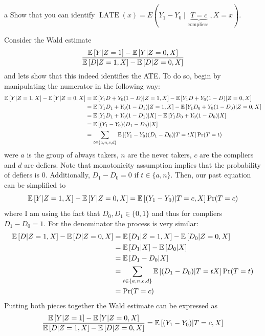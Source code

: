 \documentclass{article}
\begin{document}
\begin{problem}{a}
Show that you can identify $\operatorname{LATE}(x)=E(Y_{1}-Y_{0} \mid \underbrace{T=c}_{\text {compliers }}, X=x)$.
\end{problem}
\begin{solution}
Consider the Wald estimate
\begin{equation*}
    \frac{\mathbb{E}\left[Y\vert Z=1\right]-\mathbb{E}\left[Y\vert Z=0,X\right]}{\mathbb{E}\left[D\vert Z=1,X\right]-\mathbb{E}\left[D\vert Z=0,X\right]}
\end{equation*} and lets show that this indeed identifies the ATE. To do so, begin by manipulating the numerator in the following way:
\begin{align*}
    \mathbb{E}\left[Y\vert Z=1,X\right]-\mathbb{E}\left[Y\vert Z=0,X\right] &= \mathbb{E}\left[Y_1D+Y_0(1-D)\vert Z=1,X\right]-\mathbb{E}\left[Y_1D+Y_0(1-D)\vert Z=0,X\right] \\ 
     &= \mathbb{E}\left[Y_1D_1+Y_0(1-D_1)\vert Z=1,X\right]-\mathbb{E}\left[Y_1D_0+Y_0(1-D_0)\vert Z=0,X\right] \\ 
     &= \mathbb{E}\left[Y_1D_1+Y_0(1-D_1)\vert X\right]-\mathbb{E}\left[Y_1D_0+Y_0(1-D_0)\vert X\right] \\
     &= \mathbb{E}\left[(Y_1-Y_0)(D_1-D_0) \vert X\right] \\
     &= \sum_{t\in\{a,n,c,d\}}\mathbb{E}\left[(Y_1-Y_0)(D_1-D_0) \vert T=t X\right]\Pr(T=t)
\end{align*}
were $a$ is the group of always takers, $n$ are the never takers, $c$ are the compliers and $d$ are defiers. Note that monotonicity assumption implies that the probability of defiers is 0. Additionally, $D_1-D_0=0$ if $t\in\{a,n\}$. Then, our past equation can be simplified to 
\begin{equation*}
    \mathbb{E}\left[Y\vert Z=1,X\right]-\mathbb{E}\left[Y\vert Z=0,X\right] = \mathbb{E}\left[(Y_1-Y_0) \vert T=c, X\right]\Pr(T=c)
\end{equation*}
where I am using the fact that $D_0,D_1\in\{0,1\}$ and thus for compliers $D_1-D_0=1$. For the denominator the process is very similar:
\begin{align*}
    \mathbb{E}\left[D\vert Z=1,X\right]-\mathbb{E}\left[D\vert Z=0,X\right] &= \mathbb{E}\left[D_1\vert Z=1,X\right]-\mathbb{E}\left[D_0\vert Z=0,X\right] \\ 
    &= \mathbb{E}\left[D_1\vert X\right]-\mathbb{E}\left[D_0\vert X\right] \\ 
    &= \mathbb{E}\left[D_1-D_0\vert X\right] \\
     &= \sum_{t\in\{a,n,c,d\}}\mathbb{E}\left[(D_1-D_0) \vert T=t X\right]\Pr(T=t) \\ 
     &= \Pr(T=c)
\end{align*}
Putting both pieces together the Wald estimate can be expressed as 
\begin{equation*}
    \frac{\mathbb{E}\left[Y\vert Z=1\right]-\mathbb{E}\left[Y\vert Z=0,X\right]}{\mathbb{E}\left[D\vert Z=1,X\right]-\mathbb{E}\left[D\vert Z=0,X\right]} =  \mathbb{E}\left[(Y_1-Y_0) \vert T=c, X\right]
\end{equation*}
\end{solution}
\end{document}
